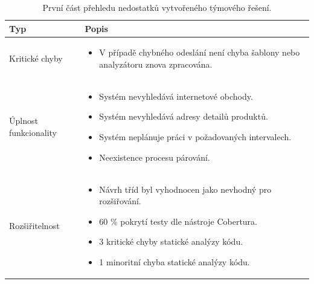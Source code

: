 \documentclass[thesis=B,czech]{FITthesis}[2012/06/26]
\begin{document}
\begin{table}[h]\centering
    \begin{tabular}{ | l | p{7cm} |}
    \hline
    Typ & Popis \\ \hline
    Kritické chyby &
    	\begin{itemize}
  			\item V případě chybného odeslání není chyba šablony nebo analyzátoru znova zpracována.
  		\end{itemize}\\ \hline
	\hline
    Úplnost funkcionality & 
    	\begin{itemize}
  			\item Systém nevyhledává internetové obchody.
  			\item Systém nevyhledává adresy detailů produktů.
  			\item Systém neplánuje práci v požadovaných intervalech.
  			\item Neexistence procesu párování.
  		\end{itemize} \\ \hline
	\hline
	Rozšiřitelnost  & 
		\begin{itemize}
  			\item Návrh tříd byl vyhodnocen jako nevhodný pro rozšiřování.
  			\item 60 \% pokrytí testy dle nástroje Cobertura.
  			\item 3 kritické chyby statické analýzy kódu.
  			\item 1 minoritní chyba statické analýzy kódu.
  		\end{itemize} \\ \hline
    \end{tabular}
	\caption{První část přehledu nedostatků vytvořeného týmového řešení.}
	  \label{table:analysis-old1}
\end{table}
\end{document}
